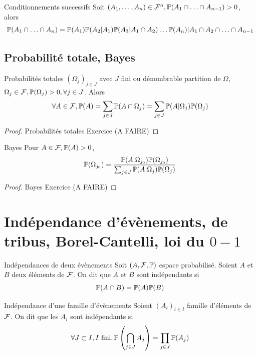 \documentclass[]{report}
\begin{document}
\begin{tm}{Conditionnements successifs}{}
    Soit $(A_1,\ldots,A_n)\in \mathcal{F}^n, \mathbb{P}(A_1\cap \ldots \cap A_{n-1})>0$, alors
    \[\mathbb{P}(A_1\cap \ldots\cap A_n)=\mathbb{P}(A_1)\mathbb{P}(A_2|A_1)\mathbb{P}(A_3|A_1\cap A_2)\ldots \mathbb{P}(A_n)| A_1\cap A_2\cap \ldots \cap A_{n-1}\]
\end{tm}

\subsection{Probabilité totale, Bayes}

\begin{tm}{Probabilités totales}{}
    $(\Omega_j)_{j\in J}$ avec $J$ fini ou dénombrable partition de $\Omega$, $\Omega_j \in \mathcal{F},\mathbb{P}(\Omega_j)>0,\forall j\in J$. Alors
    \[\forall A\in \mathcal{F}, \mathbb{P}(A)=\sum_{j\in J} \mathbb{P}(A\cap \Omega_j)=\sum_{j\in J} \mathbb{P}(A|\Omega_j)\mathbb{P}(\Omega_j)\]
\end{tm}

\begin{proof}{Probabilités totales}{}
    Exercice (A FAIRE)
\end{proof}

\begin{tm}{Bayes}{}
    Pour $A\in \mathcal{F}, \mathbb{P}(A)>0$,
    \[\mathbb{P}(\Omega_{j_0})=\frac{\mathbb{P}(A|\Omega_{j_0})\mathbb{P}(\Omega_{j_0})}{\sum_{j\in J} \mathbb{P}(A|\Omega_j)\mathbb{P}(\Omega_j)}\]
\end{tm}

\begin{proof}{Bayes}{}
    Exercice (A FAIRE)
\end{proof}

\section{Indépendance d'évènements, de tribus, Borel-Cantelli, loi du $0-1$}

\begin{df}{Indépendances de deux évènements}{}
    Soit $(A,\mathcal{F},\mathbb{P})$ espace probabilisé. Soient $A$ et $B$ deux éléments de $\mathcal{F}$. On dit que $A$ et $B$ sont indépendants si
    \[\mathbb{P}(A\cap B)=\mathbb{P}(A)\mathbb{P}(B)\]
\end{df}

\begin{df}{Indépendance d'une famille d'évènements}{}
    Soient $(A_i)_{i\in I}$ famille d'éléments de $\mathcal{F}$. On dit que les $A_i$ sont indépendants si
    \[\forall J\subset I,I\text{ fini}, \mathbb{P}\left(\bigcap_{j\in J}A_j\right)=\prod_{j\in J} \mathbb{P}(A_j)\]
\end{df}
\end{document}
